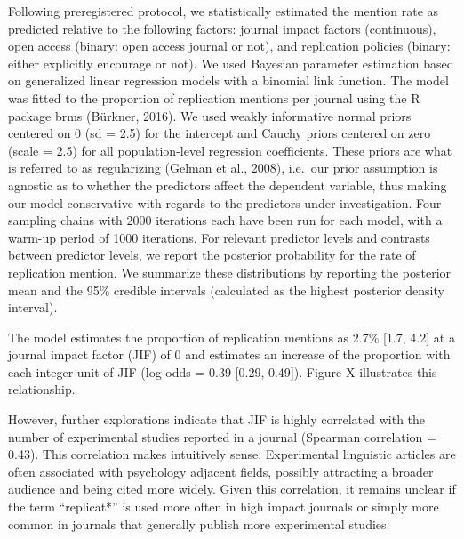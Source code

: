 \documentclass[]{elsarticle} %
\begin{document}
Following preregistered protocol, we statistically estimated the mention
rate as predicted relative to the following factors: journal impact
factors (continuous), open access (binary: open access journal or not),
and replication policies (binary: either explicitly encourage or not).
We used Bayesian parameter estimation based on generalized linear
regression models with a binomial link function. The model was fitted to
the proportion of replication mentions per journal using the R package
brms (Bürkner, 2016). We used weakly informative normal priors centered
on 0 (sd = 2.5) for the intercept and Cauchy priors centered on zero
(scale = 2.5) for all population-level regression coefficients. These
priors are what is referred to as regularizing (Gelman et al., 2008),
i.e.~our prior assumption is agnostic as to whether the predictors
affect the dependent variable, thus making our model conservative with
regards to the predictors under investigation. Four sampling chains with
2000 iterations each have been run for each model, with a warm-up period
of 1000 iterations. For relevant predictor levels and contrasts between
predictor levels, we report the posterior probability for the rate of
replication mention. We summarize these distributions by reporting the
posterior mean and the 95\% credible intervals (calculated as the
highest posterior density interval).

The model estimates the proportion of replication mentions as 2.7\%
{[}1.7, 4.2{]} at a journal impact factor (JIF) of 0 and estimates an
increase of the proportion with each integer unit of JIF (log odds =
0.39 {[}0.29, 0.49{]}). Figure X illustrates this relationship.

However, further explorations indicate that JIF is highly correlated
with the number of experimental studies reported in a journal (Spearman
correlation = 0.43). This correlation makes intuitively sense.
Experimental linguistic articles are often associated with psychology
adjacent fields, possibly attracting a broader audience and being cited
more widely. Given this correlation, it remains unclear if the term
``replicat*'' is used more often in high impact journals or simply more
common in journals that generally publish more experimental studies.
\end{document}

